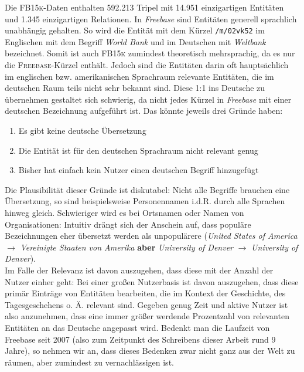 Die \textsc{FB15k}-Daten enthalten 592.213 Tripel mit 14.951 einzigartigen Entitäten und 1.345 einzigartigen Relationen.
In \emph{Freebase} sind Entitäten generell sprachlich unabhängig gehalten. So wird die Entität mit dem Kürzel \verb|/m/02vk52|
im Englischen mit dem Begriff \emph{World Bank} und im Deutschen mit \emph{Weltbank} bezeichnet. Somit ist auch
\textsc{FB15k} zumindest theoretisch mehrsprachig, da es nur die \textsc{Freebase}-Kürzel enthält.
Jedoch sind die Entitäten darin oft hauptsächlich im englischen bzw. amerikanischen Sprachraum relevante
Entitäten, die im deutschen Raum teils nicht sehr bekannt sind. Diese 1:1 ins Deutsche zu übernehmen gestaltet sich schwierig,
da nicht jedes Kürzel in \emph{Freebase} mit einer deutschen Bezeichnung aufgeführt ist. Das könnte jeweils drei Gründe haben:

\begin{enumerate}
  \item Es gibt keine deutsche Übersetzung
  \item Die Entität ist für den deutschen Sprachraum nicht relevant genug
  \item Bisher hat einfach kein Nutzer einen deutschen Begriff hinzugefügt
\end{enumerate}

Die Plausibilität dieser Gründe ist diskutabel: Nicht alle Begriffe brauchen eine Übersetzung, so sind beispielsweise
Personennamen i.d.R. durch alle Sprachen hinweg gleich. Schwieriger wird es bei Ortsnamen oder Namen von Organisationen:
Intuitiv drängt sich der Anschein auf, dass populäre Bezeichnungen eher übersetzt werden als unpopulärere
(\emph{United States of America} $\rightarrow$ \emph{Vereinigte Staaten von Amerika} \textbf{aber} \emph{University of Denver}
$\rightarrow$ \emph{University of Denver}).\\
Im Falle der Relevanz ist davon auszugehen, dass diese mit der Anzahl der Nutzer einher geht: Bei einer großen
Nutzerbasis ist davon auszugehen, dass diese primär Einträge von Entitäten bearbeiten, die im Kontext der Geschichte,
des Tagesgeschehens o. Ä. relevant sind. Gegeben genug Zeit und aktive Nutzer ist also anzunehmen, dass eine immer
größer werdende Prozentzahl von relevanten Entitäten an das Deutsche angepasst wird. Bedenkt man die Laufzeit von Freebase
seit 2007 (also zum Zeitpunkt des Schreibens dieser Arbeit rund 9 Jahre), so nehmen wir an, dass dieses Bedenken zwar nicht
ganz aus der Welt zu räumen, aber zumindest zu vernachlässigen ist.\\

